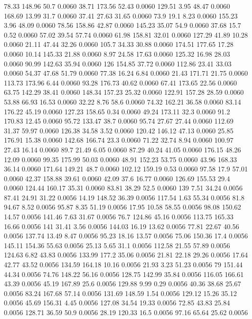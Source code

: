 78.33	148.96	50.7	0.0060
38.71	173.56	52.43	0.0060
129.51	3.95	48.47	0.0060
168.69	13.99	31.7	0.0060
37.41	27.63	31.65	0.0060
73.9	19.1	8.23	0.0060
155.23	3.96	48.09	0.0060
78.56	158.86	42.87	0.0060
145.23	35.07	54.9	0.0060
37.68	15.7	0.52	0.0060
57.02	39.54	57.74	0.0060
61.98	158.81	32.01	0.0060
127.29	41.89	10.28	0.0060
21.11	47.44	32.26	0.0060
105.7	34.33	30.88	0.0060
174.51	177.65	17.28	0.0060
10.14	145.33	21.88	0.0060
8.97	24.58	17.63	0.0060
125.32	16.98	28.03	0.0060
90.99	142.63	35.94	0.0060
126	154.85	37.72	0.0060
112.86	23.41	33.03	0.0060
54.37	47.68	51.79	0.0060
77.38	16.24	6.84	0.0060
21.43	171.71	21.75	0.0060
113.73	173.96	6.44	0.0060
93.28	176.73	40.62	0.0060
67.41	173.65	22.56	0.0060
63.75	142.29	38.41	0.0060
148.34	157.23	25.32	0.0060
122.91	157.28	28.59	0.0060
53.88	66.93	16.53	0.0060
32.22	8.76	58.6	0.0060
74.32	162.21	36.58	0.0060
83.14	176.22	45.19	0.0060
127.23	158.65	0.34	0.0060
49.24	173.11	32.3	0.0060
91.2	170.83	12.45	0.0060
95.72	133.47	38.7	0.0060
95.74	27.67	27.44	0.0060
112.69	31.37	59.97	0.0060
126.38	34.58	3.52	0.0060
120.42	146.12	47.13	0.0060
25.85	176.91	15.38	0.0060
142.68	166.74	23.3	0.0060
71.22	32.74	8.94	0.0060
100.97	27.43	16.14	0.0060
89.7	21.49	6.05	0.0060
87.29	40.24	41.05	0.0060
176.15	48.26	12.09	0.0060
99.35	175.99	50.03	0.0060
48.91	152.23	53.75	0.0060
43.96	168.33	36.14	0.0060
171.64	149.21	48.7	0.0060
102.12	159.19	0.53	0.0060
97.58	17.9	57.01	0.0060
42.37	158.88	39.61	0.0060
42.09	37.6	16.77	0.0060
126.69	155.53	29.4	0.0060
124.44	160.17	35.31	0.0060
83.81	38.29	52.5	0.0060
139	7.51	34.24	0.0056
87.41	24.91	31.22	0.0056
14.19	148.52	36.39	0.0056
117.54	1.63	55.34	0.0056
81.8	94.67	8.52	0.0056
95.87	8.35	51.19	0.0056
17.95	10.58	58.55	0.0056
98.08	150.62	14.57	0.0056
141.46	7.63	31.67	0.0056
76.7	124.86	45.16	0.0056
113.75	165.33	16.66	0.0056
141	31.41	3.56	0.0056
144.03	16.19	13.62	0.0056
77.81	22.67	40.56	0.0056
137.74	13.49	8.47	0.0056
95.23	18.16	13.57	0.0056
75.06	150.36	17.4	0.0056
145.11	154.36	55.63	0.0056
25.13	5.65	31.1	0.0056
112.58	21.55	57.89	0.0056
124.63	6.82	43.83	0.0056
133.99	177.2	35.06	0.0056
21.81	22.18	29.26	0.0056
17.64	42.77	43.52	0.0056
134.59	164.18	10.16	0.0056
21.93	3.23	51.23	0.0056
79	151.44	44.34	0.0056
74.76	148.22	56.16	0.0056
128.75	142.99	35.84	0.0056
116.05	166.61	43.39	0.0056
45.19	167.89	25.6	0.0056
129.88	9.99	0.29	0.0056
40.36	38.68	25.67	0.0056
83.24	167.68	57.14	0.0056
131.69	148.59	1.54	0.0056
129.12	15.26	35.12	0.0056
45.69	156.31	4.45	0.0056
127.08	34.54	19.33	0.0056
72.85	43.83	25.84	0.0056
128.71	36.59	50.9	0.0056
28.19	120.33	16.5	0.0056
97.16	65.64	25.62	0.0056
